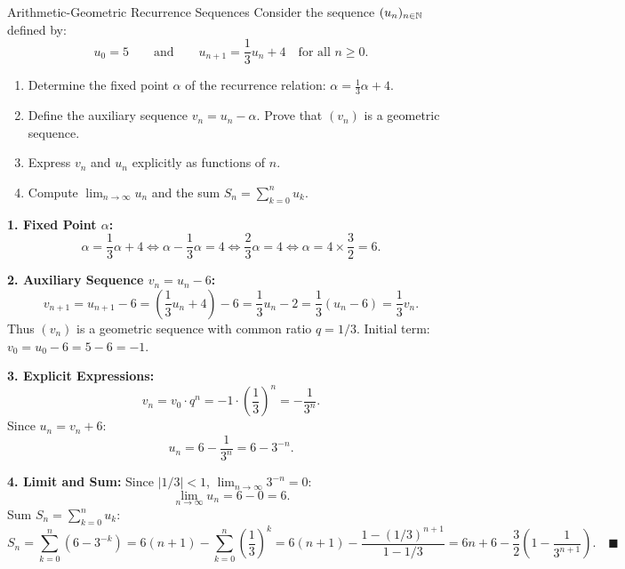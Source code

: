 \begin{exercise}{Arithmetic-Geometric Recurrence Sequences}
Consider the sequence $(u_n)_{n \in \mathbb{N}}$ defined by:
\[
u_0 = 5 \qquad \text{and} \qquad u_{n+1} = \frac{1}{3}u_n + 4 \quad \text{for all } n \ge 0.
\]
\begin{enumerate}[leftmargin=1.5em,itemsep=2pt]
  \item Determine the fixed point $\alpha$ of the recurrence relation: $\alpha = \frac{1}{3}\alpha + 4$.
  \item Define the auxiliary sequence $v_n = u_n - \alpha$. Prove that $(v_n)$ is a geometric sequence.
  \item Express $v_n$ and $u_n$ explicitly as functions of $n$.
  \item Compute $\lim_{n \to \infty} u_n$ and the sum $S_n = \sum_{k=0}^n u_k$.
\end{enumerate}
\end{exercise}

\begin{tabletworkspace}[5.0cm]
\end{tabletworkspace}

\begin{solution}
\textbf{1. Fixed Point $\alpha$:}
\[
\alpha = \frac{1}{3}\alpha + 4 \iff \alpha - \frac{1}{3}\alpha = 4 \iff \frac{2}{3}\alpha = 4 \iff \alpha = 4 \times \frac{3}{2} = 6.
\]

\textbf{2. Auxiliary Sequence $v_n = u_n - 6$:}
\[
v_{n+1} = u_{n+1} - 6 = \left(\frac{1}{3}u_n + 4\right) - 6 = \frac{1}{3}u_n - 2 = \frac{1}{3}(u_n - 6) = \frac{1}{3}v_n.
\]
Thus $(v_n)$ is a geometric sequence with common ratio $q = 1/3$.
Initial term: $v_0 = u_0 - 6 = 5 - 6 = -1$.

\textbf{3. Explicit Expressions:}
\[
v_n = v_0 \cdot q^n = -1 \cdot \left(\frac{1}{3}\right)^n = -\frac{1}{3^n}.
\]
Since $u_n = v_n + 6$:
\[
u_n = 6 - \frac{1}{3^n} = 6 - 3^{-n}.
\]

\textbf{4. Limit and Sum:}
Since $|1/3| < 1$, $\lim_{n \to \infty} 3^{-n} = 0$:
\[
\lim_{n \to \infty} u_n = 6 - 0 = 6.
\]
Sum $S_n = \sum_{k=0}^n u_k$:
\[
S_n = \sum_{k=0}^n (6 - 3^{-k}) = 6(n + 1) - \sum_{k=0}^n \left(\frac{1}{3}\right)^k = 6(n + 1) - \frac{1 - (1/3)^{n+1}}{1 - 1/3} = 6n + 6 - \frac{3}{2}\left(1 - \frac{1}{3^{n+1}}\right). \quad \blacksquare
\]
\end{solution}

